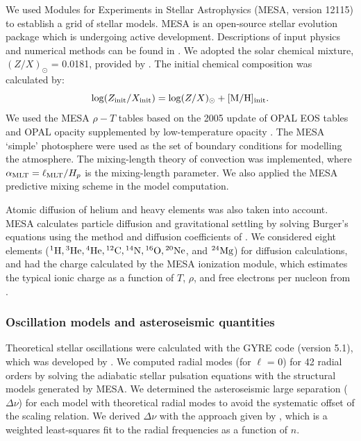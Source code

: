 \documentclass[a4paper,fleqn,usenatbib]{mnras}
\newcommand{\dnu}{\ensuremath{\Delta\nu}}
\begin{document}
We used Modules for Experiments in Stellar Astrophysics
(\textsc{MESA}, version 12115) to establish a grid of stellar models. 
\textsc{MESA} is an open-source stellar evolution package which is undergoing active development. 
Descriptions of input physics and numerical methods
can be found in \citet{Paxton.Bildsten.ea2011, Paxton.Cantiello.ea2013, Paxton.Marchant.ea2015}.
We adopted the solar chemical mixture, $(Z/X)_{\odot}$ = 0.0181,
 provided by \citet{Asplund.Grevesse.ea2009}. 
The initial chemical composition was calculated by:
%
\begin{equation}
\log (Z_{\rm{init}}/X_{\rm{init}}) = \log (Z/X)_{\odot} + \rm{[M/H]_{init}}.  \\
\end{equation}
%
We used the \textsc{MESA} $\rho-T$ tables based on the 2005
update of OPAL EOS tables \citep{Rogers.Nayfonov2002} and OPAL opacity
supplemented by low-temperature opacity \citep{Ferguson.Alexander.ea2005}. The MESA ‘simple’ photosphere were used as the set of boundary conditions for modelling the atmosphere.
The mixing-length theory of convection was implemented, where 
$\alpha_{\rm MLT} = \ell_{\rm MLT}/H_p$ is the mixing-length parameter. 
We also applied the \textsc{MESA} predictive mixing scheme \citep{Paxton.Schwab.ea2018, Paxton.Smolec.ea2019} in the model computation. 

Atomic diffusion of helium and heavy elements was also taken into account. MESA calculates particle diffusion and gravitational settling by solving Burger's equations using the method
and diffusion coefficients of \citet{Thoul.Bahcall.ea1994}. We considered eight elements (${}^1{\rm H}, {}^3{\rm He}, {}^4{\rm He}, {}^{12}{\rm C}, {}^{14}{\rm N}, {}^{16}{\rm O}, {}^{20}{\rm Ne}$, and ${}^{24}{\rm Mg}$)
for diffusion calculations, and had the charge calculated by the MESA ionization module, which estimates the typical ionic charge as a function of $T$, $\rho$, and free electrons per nucleon from \citet{Paquette.Pelletier.ea1986}.

\subsubsection{Oscillation models and asteroseismic quantities}\label{subsec:seismo_model}

Theoretical stellar oscillations were calculated with the \textsc{GYRE} code (version 5.1), which was developed by \citet{Townsend.Teitler2013}. We computed radial modes (for $\ell$ = 0) for 42 radial orders by solving the adiabatic stellar pulsation equations with the structural models generated by \textsc{MESA}. We determined the asteroseismic large separation ($\dnu$) for each model with theoretical radial modes to avoid the systematic offset of the scaling relation. We derived $\Delta \nu$ with the approach given by \citet{White.Bedding.ea2011}, which is a weighted least-squares fit to the radial frequencies as a function of $n$.
\end{document}

